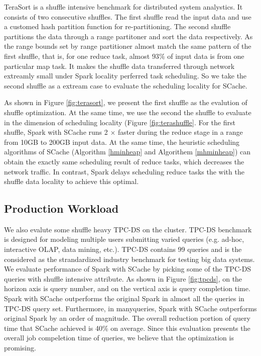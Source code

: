 TeraSort\cite{spark-tera} is a shuffle intensive benchmark for distributed system analystics. It consists of two consecutive shuffles. The first shuffle read the input data and use a customed hash partition function for re-partitioning. The second shuffle partitions the data through a range partitoner and sort the data respectively. As the range bounds set by range partitioner almost match the same pattern of the first shuffle, that is, for one reduce task, almost $93\%$ of input data is from one particular map task. It makes the shuffle data transferred through network extreamly small under Spark locality perferred task scheduling. So we take the second shuffle as a extream case to evaluate the scheduling locality for SCache. 

As shown in Figure \ref{fig:terasort}, we present the first shuffle as the evalution of shuffle optimization. At the same time, we use the second the shuffle to evaluate in the dimension of scheduling locality (Figure \ref{fig:terashuffle}. For the first shuffle, Spark with SCache runs 2 $\times$ faster during the reduce stage in a range from 10GB to 200GB input data. At the same time, the heuristic scheduling algorithms of SCache (Algorithm \ref{hminheap} and Algorithem \ref{mhminheap}) can obtain the exactly same scheduling result of reduce tasks, which decreases the network traffic. In contrast, Spark delays scheduling reduce tasks the with the shuffle data locality to achieve this optimal.

\subsection{Production Workload}

We also evalute some shuffle heavy TPC-DS\cite{tpcds} on the cluster. TPC-DS benchmark is designed for modeling multiple users submitting varied queries (e.g. ad-hoc, interactive OLAP, data mining, etc.). TPC-DS contains 99 queries and is the considered as the  strandardized industry benchmark for testing big data systems. We evaluate performance of Spark with SCache by picking some of the TPC-DS queries with shuffle intensive attribute. As shown in Figure \ref{fig:tpcds}, on the horizon axis is query number, and on the vertical axis is query completion time. Spark with SCache outperforms the original Spark in almost all the queries in TPC-DS query set. Furthermore, in manyqueries, Spark with SCache outperforms original Spark by an order of magnitude. The overall reduction portion of query time that SCache achieved is 40\% on average. Since this evaluation presents the overall job compeletion time of queries, we believe that the optimization is promising.

